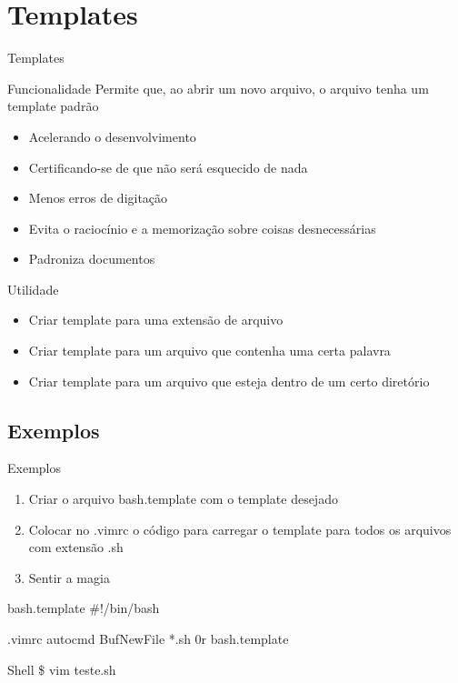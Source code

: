 \section{Templates}
\begin{frame}{Templates}
	\begin{block}{Funcionalidade}
		Permite que, ao abrir um novo arquivo, o arquivo tenha um template padrão
		\begin{itemize}
			\item Acelerando o desenvolvimento
			\item Certificando-se de que não será esquecido de nada
			\item Menos erros de digitação
			\item Evita o raciocínio e a memorização sobre coisas desnecessárias
			\item Padroniza documentos
		\end{itemize}
	\end{block}
	\begin{block}{Utilidade}
		\begin{itemize}
			\item Criar template para uma extensão de arquivo
			\item Criar template para um arquivo que contenha uma certa palavra
			\item Criar template para um arquivo que esteja dentro de um certo diretório
		\end{itemize}
	\end{block}
\end{frame}

\subsection{Exemplos}
\begin{frame}{Exemplos}
	\begin{enumerate}
		\item Criar o arquivo bash.template com o template desejado
		\item Colocar no .vimrc o código para carregar o template para todos os arquivos com extensão .sh
		\item Sentir a magia
	\end{enumerate}
	\begin{block}{bash.template}
		\#!/bin/bash
	\end{block}
	\begin{block}{.vimrc}
		autocmd BufNewFile *.sh 0r bash.template
	\end{block}
	\begin{block}{Shell}
		\$ vim teste.sh
	\end{block}
\end{frame}
